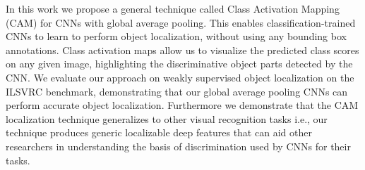 \documentclass[10pt,twocolumn,letterpaper]{article}
\begin{document}
In this work we propose a general technique called Class Activation Mapping (CAM) for CNNs with global average pooling. This enables classification-trained CNNs to learn to perform object localization, without using any bounding box annotations. Class activation maps allow us to visualize the predicted class scores on any given image, highlighting the discriminative object parts detected by the CNN. We evaluate our approach on weakly supervised object localization on the ILSVRC benchmark, demonstrating that our global average pooling CNNs can perform accurate object localization. Furthermore we demonstrate that the CAM localization technique generalizes to other visual recognition tasks i.e., our technique produces generic localizable deep features that can aid other researchers in understanding the basis of discrimination used by CNNs for their tasks.

{\small


}
\end{document}
